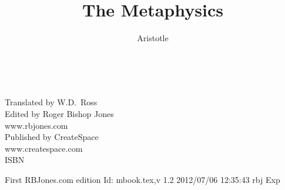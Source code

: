 \newcommand{\Alpha}{A}
\newcommand{\Beta}{B}
\newcommand{\Epsilon}{E}
\newcommand{\Zeta}{Z}
\newcommand{\Tau}{T}
\newcommand{\Eta}{H}
\newcommand{\Iota}{I}
\newcommand{\Kappa}{K}
\newcommand{\Mu}{M}
\newcommand{\Nu}{N}

\newcommand{\dq}{\texttt{"}}


\title{The Metaphysics}
\author{Aristotle}



\renewcommand{\thechapter}{Book \arabic{chapter}}
\renewcommand{\thesection}{Part \arabic{section}}

\addtolength{\cftchapnumwidth}{3em}
\addtolength{\cftsecnumwidth}{2.5em}
\addtolength{\cftsubsecnumwidth}{0.5em}

\frontmatter

\begin{titlepage}
\maketitle

\ 
\\

\vfil

\begin{centering}

\vfil


\vfill

Translated by W.D.~Ross\\

Edited by Roger Bishop Jones\\

www.rbjones.com\\

Published by CreateSpace\\

www.createspace.com\\

ISBN

\vfill

{\footnotesize






First RBJones.com edition $ $Id: mbook.tex,v 1.2 2012/07/06 12:35:43 rbj Exp $ $

}%

\end{centering}

\thispagestyle{empty}
\end{titlepage}

